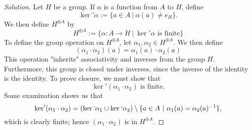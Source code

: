 \documentclass[12pt]{article}
\newenvironment{solution}
  {\renewcommand\qedsymbol{$\blacksquare$}\begin{proof}[Solution]}
{\end{proof}}
\begin{document}
\begin{solution}
  Let $H$ be a group. 
  If $\alpha$ is a function from $A$ to $H$, define 
  $$\ker' \alpha := \{a\in A \ |\ \alpha(a) \neq e_H\}.$$
  We then define $H^{\oplus A}$ by
  \begin{equation*}
    H^{\oplus A} := \{\alpha : A \to H\ |\ \ker' \alpha \text{ is finite}\}
  \end{equation*}
  To define the group operation on $H^{\oplus A}$, let $\alpha_1, \alpha_2\in H^{\oplus A}$.
  We then define
  \begin{equation*}
    (\alpha_1\cdot\alpha_2)(a) = \alpha_1(a) \cdot \alpha_2(a)
  \end{equation*}
  This operation "inherits" associativity and inverses from the group $H$.
  Furthermore, this group is closed under inverses, since the inverse of the identity is the identity.
  To prove closure, we must show that
  \begin{equation*}
    \ker' (\alpha_1\cdot\alpha_2) \text{ is finite.}
  \end{equation*}
  Some examination shows us that
  \begin{equation*}
    \ker' (\alpha_1\cdot\alpha_2) = (\ker` \alpha_1 \cup \ker` \alpha_2) \setminus 
    \{a\in A\ |\ \alpha_1(a) = \alpha_2(a)^{-1}\},
  \end{equation*}
  which is clearly finite; hence $(\alpha_1\cdot\alpha_2)$ is in $H^{\oplus A}$.
\end{solution}
\end{document}
